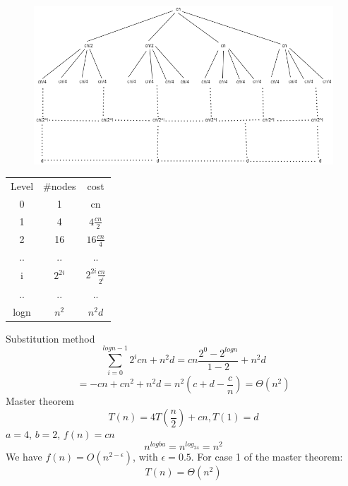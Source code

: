 \begin{figure}[H]
\includegraphics[scale=0.5]{Tree.png}
\end{figure}
\begin{tabular}{ccc}
Level &\#nodes &cost\\
0& 1 & cn \\
1 & 4 & $4\frac{cn}{2}$ \\
2 & 16 & $16\frac{cn}{4}$\\ 
.. & .. & ..\\
i & $2^{2i}$ & $2^{2i}\frac{cn}{2^i}$\\
.. & .. & ..\\
logn & $n^2$ & $n^2d$
\end{tabular}
Substitution method
\begin{equation*}
	\sum_{i = 0}^{logn - 1}2^icn + n^2d = cn\frac{2^0 - 2^{logn}}{1 - 2} + n^2d
\end{equation*} 
\begin{equation*}
	= - cn + cn^2 + n^2d = n^2(c + d - \frac{c}{n}) = \Theta(n^2)
\end{equation*} 
Master theorem
\begin{equation*}
	T(n) = 4T(\frac{n}{2}) + cn, T(1) = d
\end{equation*}
$a = 4$, $b = 2$, $f(n) = cn$
\begin{equation*}
	n^{logba} = n^{log_24} = n^2
\end{equation*} 
We have $f(n) = O(n^{2 - \epsilon})$, with $\epsilon = 0.5$. For case 1 of the master theorem:
\begin{equation*}
	T(n) = \Theta(n^2)
\end{equation*}